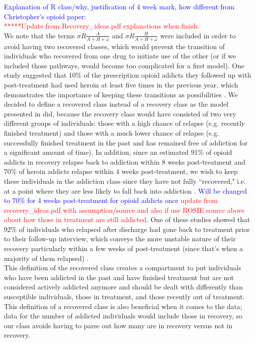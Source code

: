 \documentclass[12pt]{article}
\begin{document}
\textcolor{blue}{Explanation of R class/why, justification of 4 week mark, how different from Christopher's opioid paper:} \\
\textcolor{red}{*****Update from Recovery\_ideas.pdf explanations when finish.}\\
We note that the terms $\sigma R \frac{A}{A+H+\omega}$ and $\sigma R \frac{H}{A+H+\omega}$ were included in order to avoid having two recovered classes, which would prevent the transition of individuals who recovered from one drug to initiate use of the other (or if we included those pathways, would become too complicated for a first model). One study suggested that 10\% of the prescription opioid addicts they followed up with post-treatment had used heroin at least five times in the previous year, which demonstrates the importance of keeping these transitions as possibilities \cite{Weiss}. We decided to define a recovered class instead of a recovery class as the model presented in \cite{Battista} did, because the recovery class would have consisted of two very different groups of individuals: those with a high chance of relapse (e.g. recently finished treatment) and those with a much lower chance of relapse (e.g. successfully finished treatment in the past and has remained free of addiction for a significant amount of time). In addition, since an estimated 91\% of opioid addicts in recovery relapse back to addiction within 8 weeks post-treatment and 70\% of heroin addicts relapse within 4 weeks post-treatment, we wish to keep these individuals in the addiction class since they have not fully ``recovered," i.e. at a point where they are less likely to fall back into addiction \cite{Weiss, Smyth}. \textcolor{blue}{Will be changed to 70\% for 4 weeks post-treatment for opioid addicts once \textcolor{red}{update from recovery\_ideas.pdf with assumption/source and also if use ROSIE source above about how those in treatment are still addicted.}} One of these studies showed that 92\% of individuals who relapsed after discharge had gone back to treatment prior to their follow-up interview, which conveys the more unstable nature of their recovery particularly within a few weeks of post-treatment (since that's when a majority of them relapsed) \cite{Smyth}. \\ This definition of the recovered class creates a compartment to put individuals who have been addicted in the past and have finished treatment but are not considered actively addicted anymore and should be dealt with differently than susceptible individuals, those in treatment, and those recently out of treatment. This definition of a recovered class is also beneficial when it comes to the data; data for the number of addicted individuals would include those in recovery, so our class avoids having to parse out how many are in recovery versus not in recovery.  \\ 
\end{document}
